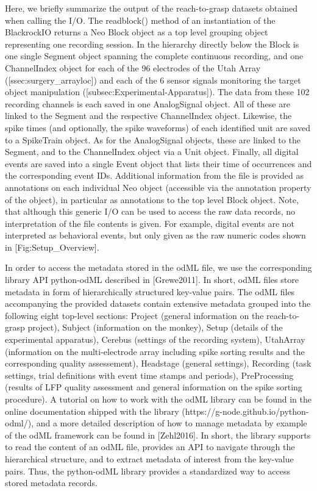 Here, we briefly summarize the output of the reach-to-grasp datasets obtained when calling the I/O. The readblock() method of an instantiation of the BlackrockIO returns a Neo Block object as a top level grouping object representing one recording session. In the hierarchy directly below the Block is one single Segment object spanning the complete continuous recording, and one ChannelIndex object for each of the 96 electrodes of the Utah Array ([ssec:surgery\_arrayloc]) and each of the 6 sensor signals monitoring the target object manipulation ([subsec:Experimental-Apparatus]). The data from these 102 recording channels is each saved in one AnalogSignal object. All of these are linked to the Segment and the respective ChannelIndex object. Likewise, the spike times (and optionally, the spike waveforms) of each identified unit are saved to a SpikeTrain object. As for the AnalogSignal objects, these are linked to the Segment, and to the ChannelIndex object via a Unit object. Finally, all digital events are saved into a single Event object that lists their time of occurrences and the corresponding event IDs. Additional information from the file is provided as annotations on each individual Neo object (accessible via the annotation property of the object), in particular as annotations to the top level Block object. Note, that although this generic I/O can be used to access the raw data records, no interpretation of the file contents is given. For example, digital events are not interpreted as behavioral events, but only given as the raw numeric codes shown in [Fig:Setup\_Overview]. 

In order to access the metadata stored in the odML file, we use the corresponding library API python-odML described in [Grewe2011]. In short, odML files store metadata in form of hierarchically structured key-value pairs. The odML files accompanying the provided datasets contain extensive metadata grouped into the following eight top-level sections: Project (general information on the reach-to-grasp project), Subject (information on the monkey), Setup (details of the experimental apparatus), Cerebus (settings of the recording system), UtahArray (information on the multi-electrode array including spike sorting results and the corresponding quality assessement), Headstage (general settings), Recording (task settings, trial definitions with event time stamps and periods), PreProcessing (results of LFP quality assessment and general information on the spike sorting procedure). A tutorial on how to work with the odML library can be found in the online documentation shipped with the library (https://g-node.github.io/python-odml/), and a more detailed description of how to manage metadata by example of the odML framework can be found in [Zehl2016]. In short, the library supports to read the content of an odML file, provides an API to navigate through the hierarchical structure, and to extract metadata of interest from the key-value pairs. Thus, the python-odML library provides a standardized way to access stored metadata records. 

